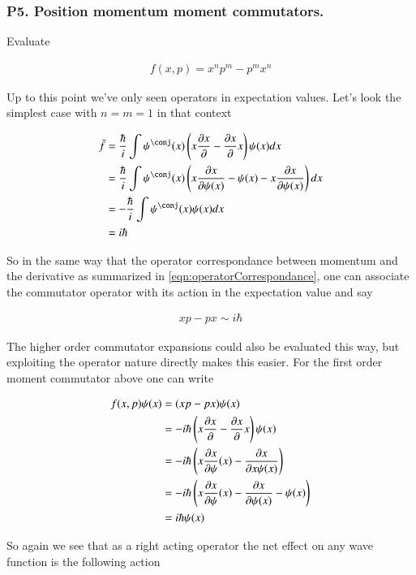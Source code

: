 \documentclass{article}
\begin{document}
\subsubsection{ P5. Position momentum moment commutators. }

Evaluate

\begin{align*}
f(x,p) = x^n p^m - p^m x^n
\end{align*}

Up to this point we've only seen operators in expectation values.  Let's look the simplest case with $n = m = 1$ in that
context

\begin{align*}
\bar{f} 
&= \frac{\hbar}{i} \int \psi^\conj(x) \left(x \PD{x}{} - \PD{x}{} x \right) \psi(x) dx \\
&= \frac{\hbar}{i} \int \psi^\conj(x) \left(x \PD{x}{\psi(x)} - \psi(x) - x \PD{x}{\psi(x)} \right) dx \\
&= -\frac{\hbar}{i} \int \psi^\conj(x) \psi(x) dx \\
&= {i\hbar}
\end{align*}

So in the same way that the operator correspondance between momentum and the derivative as summarized in 
\ref{eqn:operatorCorrespondance}, one can associate the commutator operator with its action in the expectation value and
say

\begin{align}\label{eqn:commutator}
x p - p x \sim  i\hbar
\end{align}

The higher order commutator expansions could also be evaluated this way, but exploiting the operator nature directly 
makes this easier.  For the first order moment commutator above one can write

\begin{align*}
f(x,p) \psi(x) 
&= (x p - p x) \psi(x) \\
&= -i \hbar \left(x \frac{\partial{x}}{\partial {}} - \frac{\partial{x}}{\partial {}} x\right) \psi(x) \\
&= -i \hbar \left(x \frac{\partial{x}}{\partial {\psi}}(x) - \frac{\partial{x}}{\partial {x \psi(x)}} \right) \\
&= -i \hbar \left(x \frac{\partial{x}}{\partial {\psi}}(x) - \frac{\partial{x}}{\partial {\psi(x)}} -\psi(x) \right) \\
&= i \hbar \psi(x) \\
\end{align*}

So again we see that as a right acting operator the net effect on any wave function is the following action
\end{document}
